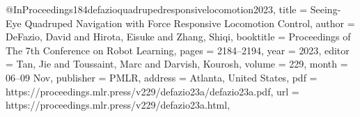 @InProceedings{184defazioquadrupedresponsivelocomotion2023,
title = 	 {Seeing-Eye Quadruped Navigation with Force Responsive Locomotion Control},
author =       {DeFazio, David and Hirota, Eisuke and Zhang, Shiqi},
booktitle = 	 {Proceedings of The 7th Conference on Robot Learning},
pages = 	 {2184--2194},
year = 	 {2023},
editor = 	 {Tan, Jie and Toussaint, Marc and Darvish, Kourosh},
volume = 	 {229},
month = 	 {06--09 Nov},
publisher =    {PMLR},
address = {Atlanta, United States},
pdf = 	 {https://proceedings.mlr.press/v229/defazio23a/defazio23a.pdf},
url = 	 {https://proceedings.mlr.press/v229/defazio23a.html},
}